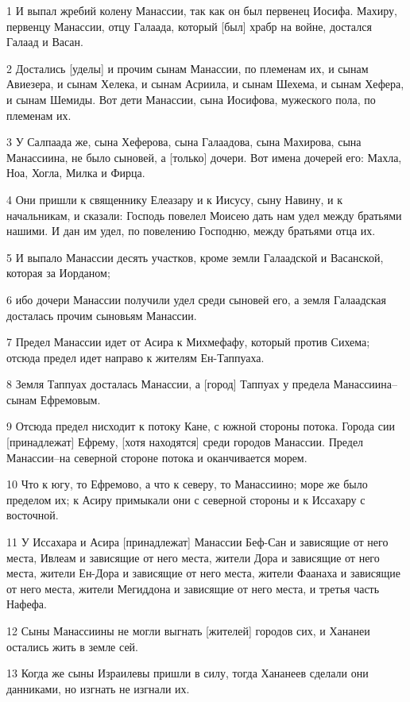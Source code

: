 \par 1 И выпал жребий колену Манассии, так как он был первенец Иосифа. Махиру, первенцу Манассии, отцу Галаада, который [был] храбр на войне, достался Галаад и Васан.
\par 2 Достались [уделы] и прочим сынам Манассии, по племенам их, и сынам Авиезера, и сынам Хелека, и сынам Асриила, и сынам Шехема, и сынам Хефера, и сынам Шемиды. Вот дети Манассии, сына Иосифова, мужеского пола, по племенам их.
\par 3 У Салпаада же, сына Хеферова, сына Галаадова, сына Махирова, сына Манассиина, не было сыновей, а [только] дочери. Вот имена дочерей его: Махла, Ноа, Хогла, Милка и Фирца.
\par 4 Они пришли к священнику Елеазару и к Иисусу, сыну Навину, и к начальникам, и сказали: Господь повелел Моисею дать нам удел между братьями нашими. И дан им удел, по повелению Господню, между братьями отца их.
\par 5 И выпало Манассии десять участков, кроме земли Галаадской и Васанской, которая за Иорданом;
\par 6 ибо дочери Манассии получили удел среди сыновей его, а земля Галаадская досталась прочим сыновьям Манассии.
\par 7 Предел Манассии идет от Асира к Михмефафу, который против Сихема; отсюда предел идет направо к жителям Ен-Таппуаха.
\par 8 Земля Таппуах досталась Манассии, а [город] Таппуах у предела Манассиина--сынам Ефремовым.
\par 9 Отсюда предел нисходит к потоку Кане, с южной стороны потока. Города сии [принадлежат] Ефрему, [хотя находятся] среди городов Манассии. Предел Манассии--на северной стороне потока и оканчивается морем.
\par 10 Что к югу, то Ефремово, а что к северу, то Манассиино; море же было пределом их; к Асиру примыкали они с северной стороны и к Иссахару с восточной.
\par 11 У Иссахара и Асира [принадлежат] Манассии Беф-Сан и зависящие от него места, Ивлеам и зависящие от него места, жители Дора и зависящие от него места, жители Ен-Дора и зависящие от него места, жители Фаанаха и зависящие от него места, жители Мегиддона и зависящие от него места, и третья часть Нафефа.
\par 12 Сыны Манассиины не могли выгнать [жителей] городов сих, и Хананеи остались жить в земле сей.
\par 13 Когда же сыны Израилевы пришли в силу, тогда Хананеев сделали они данниками, но изгнать не изгнали их.

